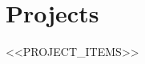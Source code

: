 \section*{Projects}
\resumeSubHeadingListStart
<<PROJECT_ITEMS>>
\resumeSubHeadingListEnd
\vspace{-0.2cm}
